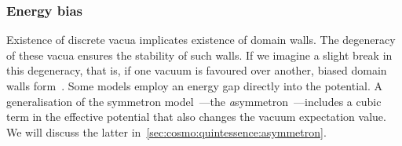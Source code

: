     \subsubsection{Energy bias}
        Existence of discrete vacua implicates existence of domain walls. The degeneracy of these vacua ensures the stability of such walls. If we imagine a slight break in this degeneracy, that is, if one vacuum is favoured over another, biased domain walls form~\citep{vachaspatiKinksDomainWalls2006}. Some models employ an energy gap directly into the potential. A generalisation of the symmetron model~\citep{hinterbichlerSymmetronCosmology2011}---the \emph{a}symmetron~\citep{perivolaropoulosGravitationalTransitionsExplicitly2022}---includes a cubic term in the effective potential that also changes the vacuum expectation value. We will discuss the latter in~\cref{sec:cosmo:quintessence:asymmetron}.







    



    
    




    